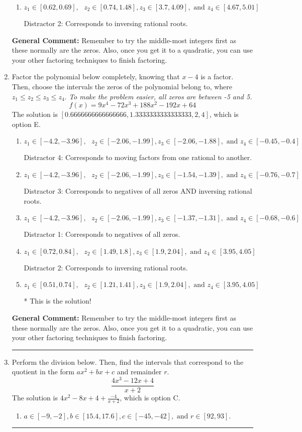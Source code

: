 \documentclass{extbook}[14pt]
\newcommand{\litem}[1]{\item #1

\rule{\textwidth}{0.4pt}}
\begin{document}
\begin{enumerate}
{\begin{enumerate}[label=\Alph*.]
 Distractor 1: Corresponds to negatives of all zeros.
\item \( z_1 \in [0.62, 0.69], \text{   }  z_2 \in [0.74, 1.48], z_3 \in [3.7, 4.09], \text{   and   } z_4 \in [4.67, 5.01] \)

 Distractor 2: Corresponds to inversing rational roots.
\end{enumerate}

\textbf{General Comment:} Remember to try the middle-most integers first as these normally are the zeros. Also, once you get it to a quadratic, you can use your other factoring techniques to finish factoring.
}
\litem{
Factor the polynomial below completely, knowing that $x-4$ is a factor. Then, choose the intervals the zeros of the polynomial belong to, where $z_1 \leq z_2 \leq z_3 \leq z_4$. \textit{To make the problem easier, all zeros are between -5 and 5.}
\[ f(x) = 9x^{4} -72 x^{3} +188 x^{2} -192 x + 64 \]The solution is \( [0.6666666666666666, 1.3333333333333333, 2, 4] \), which is option E.\begin{enumerate}[label=\Alph*.]
\item \( z_1 \in [-4.2, -3.96], \text{   }  z_2 \in [-2.06, -1.99], z_3 \in [-2.06, -1.88], \text{   and   } z_4 \in [-0.45, -0.4] \)

 Distractor 4: Corresponds to moving factors from one rational to another.
\item \( z_1 \in [-4.2, -3.96], \text{   }  z_2 \in [-2.06, -1.99], z_3 \in [-1.54, -1.39], \text{   and   } z_4 \in [-0.76, -0.7] \)

 Distractor 3: Corresponds to negatives of all zeros AND inversing rational roots.
\item \( z_1 \in [-4.2, -3.96], \text{   }  z_2 \in [-2.06, -1.99], z_3 \in [-1.37, -1.31], \text{   and   } z_4 \in [-0.68, -0.6] \)

 Distractor 1: Corresponds to negatives of all zeros.
\item \( z_1 \in [0.72, 0.84], \text{   }  z_2 \in [1.49, 1.8], z_3 \in [1.9, 2.04], \text{   and   } z_4 \in [3.95, 4.05] \)

 Distractor 2: Corresponds to inversing rational roots.
\item \( z_1 \in [0.51, 0.74], \text{   }  z_2 \in [1.21, 1.41], z_3 \in [1.9, 2.04], \text{   and   } z_4 \in [3.95, 4.05] \)

* This is the solution!
\end{enumerate}

\textbf{General Comment:} Remember to try the middle-most integers first as these normally are the zeros. Also, once you get it to a quadratic, you can use your other factoring techniques to finish factoring.
}
\litem{
Perform the division below. Then, find the intervals that correspond to the quotient in the form $ax^2+bx+c$ and remainder $r$.
\[ \frac{4x^{3} -12 x + 4}{x + 2} \]The solution is \( 4x^{2} -8 x + 4 + \frac{-4}{x + 2} \), which is option C.\begin{enumerate}[label=\Alph*.]
\item \( a \in [-9, -2], b \in [15.4, 17.6], c \in [-45, -42], \text{ and } r \in [92, 93]. \)


\end{enumerate}}
\end{enumerate}
\end{document}

